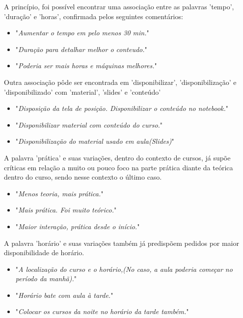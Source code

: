 A princípio, foi possível encontrar uma associação entre as palavras 'tempo', 'duração' e 'horas', confirmada pelos seguintes comentários:

\begin{itemize}
\item "\textit{Aumentar o tempo em pelo menos 30 min.}"
\item "\textit{Duração para detalhar melhor o conteudo.}"
\item "\textit{Poderia ser mais horas e máquinas melhores.}"
\end{itemize}

Outra associação pôde ser encontrada em 'disponibilizar', 'disponibilização' e 'disponibilizado' com 'material', 'slides' e 'conteúdo'

\begin{itemize}
\item "\textit{Disposição da tela de posição. Disponibilizar o conteúdo no notebook.}"
\item "\textit{Disponibilizar material com conteúdo do curso.}"
\item "\textit{Disponibilização do material usado em aula(Slides)}"
\end{itemize}

A palavra 'prática' e suas variações, dentro do contexto de cursos, já supõe críticas em relação a muito ou pouco foco na parte prática diante da teórica dentro do curso, sendo nesse contexto o último caso.

\begin{itemize}
\item "\textit{Menos teoria, mais prática.}"
\item "\textit{Mais prática. Foi muito teórico.}"
\item "\textit{Maior interação, prática desde o início.}"
\end{itemize}

A palavra 'horário' e suas variações também já predispõem pedidos por maior disponibilidade de horário.

\begin{itemize}
\item "\textit{A localização do curso e o horário,(No caso, a aula poderia começar no período da manhã).}"
\item "\textit{Horário bate com aula à tarde.}"
\item "\textit{Colocar os cursos da noite no horário da tarde também.}"
\end{itemize}

